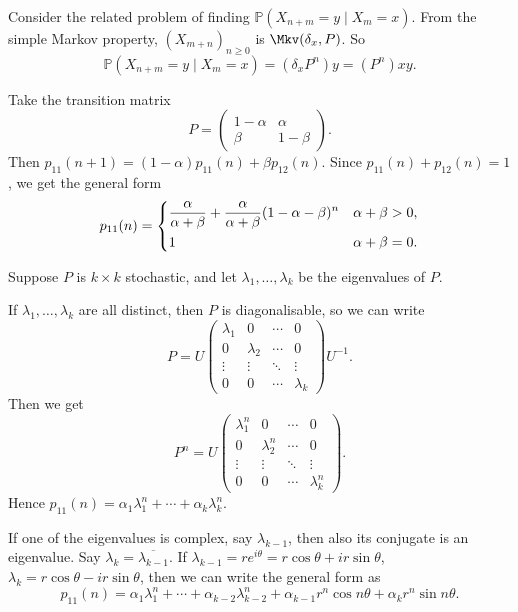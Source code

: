 \documentclass[12pt]{article}
\begin{document}
Consider the related problem of finding $\mathbb{P}(X_{n+m} = y \mid X_m = x)$. From the simple Markov property, $(X_{m+n})_{n \geq 0}$ is $\Mkv(\delta_{x}, P)$. So
\[
	\mathbb{P}(X_{n+m} = y \mid X_{m} = x) = (\delta_{x} P^{n})y = (P^{n})xy
.\]

\begin{exbox}
	Take the transition matrix
	\[
	P = 
	\begin{pmatrix}
		1 - \alpha & \alpha \\
		\beta & 1 - \beta
	\end{pmatrix}
	.\] 
	Then $p_{11}(n+1) = (1 - \alpha)p_{11}(n) + \beta p_{12}(n)$. Since $p_{11}(n) + p_{12}(n) = 1$, we get the general form
	\[
		p_{11}(n) =
		\begin{dcases}
			\frac{\alpha}{\alpha + \beta} + \frac{\alpha}{\alpha + \beta}(1 - \alpha - \beta)^{n} & \alpha + \beta > 0, \\
			1 & \alpha + \beta = 0.
		\end{dcases}	
	\]
\end{exbox}

Suppose $P$ is $k \times k$ stochastic, and let $\lambda_1, \ldots, \lambda_k$ be the eigenvalues of $P$.

If $\lambda_1, \ldots, \lambda_k$ are all distinct, then $P$ is diagonalisable, so we can write
\[
P = U
\begin{pmatrix}
	\lambda_1 & 0 & \cdots & 0 \\
	0 & \lambda_2 & \cdots & 0 \\
	\vdots & \vdots & \ddots & \vdots \\
	0 & 0 & \cdots & \lambda_k
\end{pmatrix}
U^{-1}
.\]
Then we get
\[
P^{n} = U
\begin{pmatrix}
	\lambda_1^{n} & 0 & \cdots & 0 \\
	0 & \lambda_2^{n} & \cdots & 0 \\
	\vdots & \vdots & \ddots & \vdots \\
	0 & 0 & \cdots & \lambda_k^{n}
\end{pmatrix}
.\]
Hence $p_{11}(n) = \alpha_1 \lambda_1^{n} + \cdots + \alpha_k \lambda_k^{n}$.

If one of the eigenvalues is complex, say $\lambda_{k-1}$, then also its conjugate is an eigenvalue. Say $\lambda_{k} = \overline{\lambda_{k-1}}$. If $\lambda_{k-1} = r e^{i \theta} = r \cos \theta + i r \sin \theta$, $\lambda_k = r \cos \theta - i r \sin \theta$, then we can write the general form as
\[
	p_{11}(n) = \alpha_1 \lambda_1^{n} + \cdots + \alpha_{k-2} \lambda_{k-2}^{n} + \alpha_{k-1} r^{n} \cos n \theta + \alpha_{k} r^{n} \sin n \theta
.\]
\end{document}
